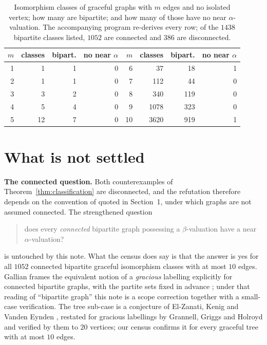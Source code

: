 \documentclass[11pt]{amsart}
\theoremstyle{remark}
\begin{document}
\begin{table}[htbp]
\renewcommand{\arraystretch}{1.08}
\begin{tabular}{rrrr@{\quad}rrrr}
\hline
$m$ & classes & bipart. & no near $\alpha$ &
$m$ & classes & bipart. & no near $\alpha$\\
\hline
 1 &     1 &   1 & 0 &  6 &    37 &   18 & 1\\
 2 &     1 &   1 & 0 &  7 &   112 &   44 & 0\\
 3 &     3 &   2 & 0 &  8 &   340 &  119 & 0\\
 4 &     5 &   4 & 0 &  9 &  1078 &  323 & 0\\
 5 &    12 &   7 & 0 & 10 &  3620 &  919 & 1\\
\hline
\end{tabular}
\medskip
\caption{Isomorphism classes of graceful graphs with $m$ edges and no isolated
vertex; how many are bipartite; and how many of those have no near
$\alpha$-valuation. The accompanying program re-derives every row; of the $1438$
bipartite classes listed, $1052$ are connected and $386$ are disconnected.}
\label{tab:census}
\end{table}

\section{What is not settled}\label{sec:open}

\noindent\textbf{The connected question.} Both counterexamples of
Theorem~\ref{thm:classification} are disconnected, and the refutation therefore
depends on the convention of \cite{AHM} quoted in Section~1, under which graphs
are not assumed connected. The strengthened question
\begin{quote}
does every \emph{connected} bipartite graph possessing a
$\beta$-valuation have a near $\alpha$-valuation?
\end{quote}
is untouched by this note. What the census does say is that the answer is yes
for all $1052$ connected bipartite graceful isomorphism classes with at most
$10$ edges. Gallian frames the equivalent notion of a \emph{gracious} labelling
explicitly for connected bipartite graphs, with the partite sets fixed in advance
\cite[\S3.1]{Gal}; under that reading of ``bipartite graph'' this note is a scope
correction together with a small-case verification. The tree sub-case is a
conjecture of El-Zanati, Kenig and Vanden Eynden \cite{EKV}, restated for
gracious labellings by Grannell, Griggs and Holroyd \cite{GGH} and verified by
them to $20$ vertices; our census confirms it for every graceful tree with at
most $10$ edges.
\end{document}
